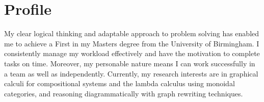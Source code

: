 \section*{Profile}
\stroke

My clear logical thinking and adaptable approach to problem solving has enabled
me to achieve a First in my Masters degree from the University of Birmingham.
I consistently manage my workload effectively and have the motivation to
complete tasks on time. Moreover, my personable nature means I can work
successfully in a team as well as independently. Currently, my research
interests are in graphical calculi for compositional systems and the lambda
calculus using monoidal categories, and reasoning diagrammatically with graph
rewriting techniques.